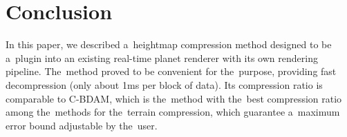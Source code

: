 \chapter{Conclusion}\label{sec:conclusion}

In this paper, we described a~heightmap compression method designed to be a~plugin into an existing real-time planet renderer with its own rendering pipeline. The~method proved to be convenient for the~purpose, providing fast decompression (only about 1ms per block of data). Its compression ratio is comparable to C-BDAM, which is the~method with the~best compression ratio among the~methods for the~terrain compression, which guarantee a~maximum error bound adjustable by the~user.